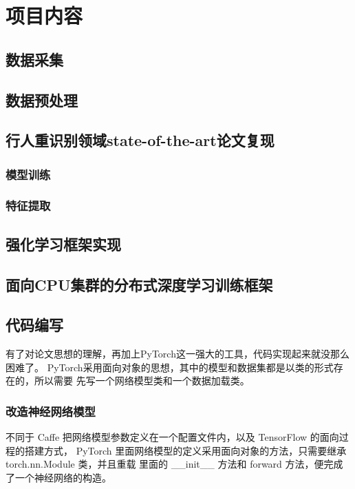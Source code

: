 \section{项目内容}

\subsection{数据采集}

\subsection{数据预处理}

\subsection{行人重识别领域state-of-the-art论文复现}

\subsubsection{模型训练}

\subsubsection{特征提取}

\subsection{强化学习框架实现}

\subsection{面向CPU集群的分布式深度学习训练框架}


\subsection{代码编写}
有了对论文思想的理解，再加上PyTorch这一强大的工具，代码实现起来就没那么困难了。
PyTorch采用面向对象的思想，其中的模型和数据集都是以类的形式存在的，所以需要
先写一个网络模型类和一个数据加载类。

\subsubsection{改造神经网络模型}
不同于 Caffe 把网络模型参数定义在一个配置文件内，以及 TensorFlow 的面向过程的搭建方式，
PyTorch 里面网络模型的定义采用面向对象的方法，只需要继承 torch.nn.Module 类，并且重载
里面的 \_\_init\_\_\(\) 方法和 forward\(\) 方法，便完成了一个神经网络的构造。\\

